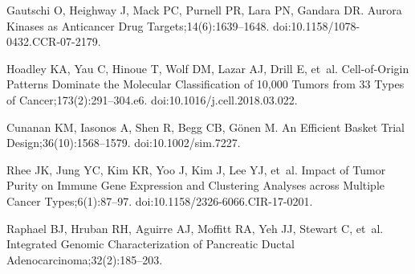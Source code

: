 \documentclass[10pt,letterpaper]{article}
\begin{document}
\begin{thebibliography}{10}
	Gautschi O, Heighway J, Mack PC, Purnell PR, Lara PN, Gandara DR.
	\newblock Aurora {{Kinases}} as {{Anticancer Drug Targets}};14(6):1639--1648.
	\newblock doi:{10.1158/1078-0432.CCR-07-2179}.
	
	Hoadley KA, Yau C, Hinoue T, Wolf DM, Lazar AJ, Drill E, et~al.
	\newblock Cell-of-{{Origin Patterns Dominate}} the {{Molecular Classification}}
	of 10,000 {{Tumors}} from 33 {{Types}} of {{Cancer}};173(2):291--304.e6.
	\newblock doi:{10.1016/j.cell.2018.03.022}.
	
	Cunanan KM, Iasonos A, Shen R, Begg CB, Gönen M.
	\newblock An {{Efficient Basket Trial Design}};36(10):1568--1579.
	\newblock doi:{10.1002/sim.7227}.
	
	Rhee JK, Jung YC, Kim KR, Yoo J, Kim J, Lee YJ, et~al.
	\newblock Impact of {{Tumor Purity}} on {{Immune Gene Expression}} and
	{{Clustering Analyses}} across {{Multiple Cancer Types}};6(1):87--97.
	\newblock doi:{10.1158/2326-6066.CIR-17-0201}.
	
	Raphael BJ, Hruban RH, Aguirre AJ, Moffitt RA, Yeh JJ, Stewart C, et~al.
	\newblock Integrated Genomic Characterization of Pancreatic Ductal
	Adenocarcinoma;32(2):185--203.
	
\end{thebibliography}
\end{document}
